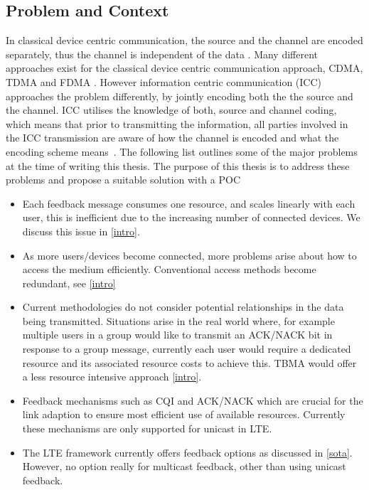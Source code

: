 \documentclass{article}
\begin{document}
\subsection{Problem and Context}\label{prob_context}
In classical device centric communication, the source and the channel are encoded separately, thus the channel is independent of the data \cite{shannon_theory}. Many different approaches exist for the classical device centric communication approach, CDMA, TDMA and FDMA \cite{multiple_access_protocols}.  However information centric communication (ICC) approaches the problem differently, by jointly encoding both the the source and the channel. ICC utilises the knowledge of both, source  and channel coding, which means that prior to transmitting the information, all parties involved in the ICC transmission are aware of how the channel is encoded and what the encoding scheme means~\cite{information_centric}. The following list outlines some of the major problems at the time of writing this thesis. The purpose of this thesis is to address these problems and propose a suitable solution with a \ac{POC}  

\begin{itemize}
  \item Each feedback message consumes one resource, and scales linearly with each user, this is inefficient due to the increasing number of connected devices. We discuss this issue in \cref{intro}.
  \item As more users/devices become connected, more problems arise about how to access the medium efficiently. Conventional access methods become redundant, see \cref{intro}
  \item Current methodologies do not consider potential relationships in the data being transmitted. Situations arise in the real world where, for example multiple users in a group would like to transmit an ACK/NACK bit in response to a group message, currently each user would require a dedicated resource and its associated resource costs to achieve this. TBMA would offer a less resource intensive approach \cref{intro}. 
  \item Feedback mechanisms such as CQI and ACK/NACK which are crucial for the link adaption to ensure most efficient use of available resources. Currently these mechanisms are only supported for unicast in LTE. 
  \item The LTE framework currently offers feedback options as discussed in \cref{sota}. However, no option really for multicast feedback, other than using unicast feedback.
\end{itemize}
\end{document}
